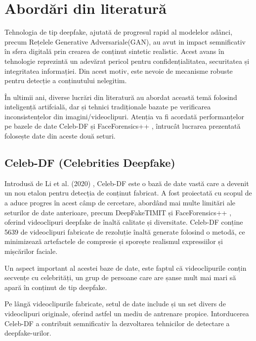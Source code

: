 \chapter{Abordări din literatură}
\label{Capitolul 3}
Tehnologia de tip deepfake, ajutată de progresul rapid al modelelor adânci, precum Rețelele Generative Adversariale(GAN), au avut in impact semnificativ în sfera digitală prin crearea de conținut sintetic realistic. Acest avans în tehnologie reprezintă un adevărat pericol pentru confidențialitatea, securitatea și integritatea informației. Din acest motiv, este nevoie de mecanisme robuste pentru detecție a conținutului nelegitim. 

În ultimii ani, diverse lucrări din literatură au abordat această temă folosind inteligență artifcială, dar și tehnici tradiționale bazate pe verificarea inconsistențelor din imagini/videoclipuri. Atenția va fi acordată performanțelor pe bazele de date Celeb-DF \cite{li2020celeb} și FaceForensics++ \cite{rössler2019faceforensics}, întrucât lucrarea prezentată folosește date din aceste două seturi.

\section{Celeb-DF (Celebrities Deepfake)}

Introdusă de Li et al. (2020) \cite{li2020celeb}, Celeb-DF este o bază de date vastă care a devenit un nou etalon pentru detecția de conținut fabricat. A fost proiectată cu scopul de a aduce progres în acest câmp de cercetare, abordând mai multe limitări ale seturilor de date anterioare, precum DeepFakeTIMIT \cite{khan2021adversarially} și FaceForensics++ \cite{rössler2019faceforensics}, oferind videoclipuri deepfake de înaltă calitate și diversitate. Celeb-DF conține 5639 de videoclipuri fabricate de rezoluție înaltă generate folosind o metodă, ce minimizează artefactele de compresie și sporește realismul expressiilor și mișcărilor faciale. 

Un aspect important al acestei baze de date, este faptul că videoclipurile conțin secvențe cu celebrități, un grup de persoane care are șanse mult mai mari să apară în conținut de tip deepfake.

Pe lângă videoclipurile fabricate, setul de date include și un set divers de videoclipuri originale, oferind astfel un mediu de antrenare propice. Intorducerea Celeb-DF a contribuit semnificativ la dezvoltarea tehnicilor de detectare a deepfake-urilor.


